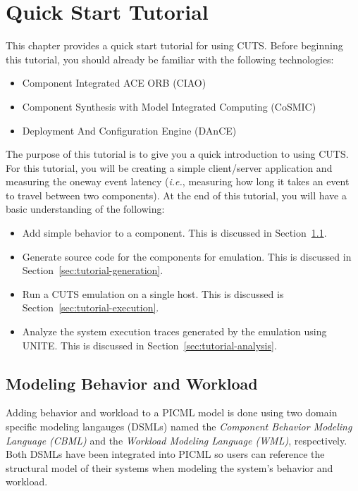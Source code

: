 
\chapter{Quick Start Tutorial}
\label{chap:tutorial}

This chapter provides a quick start tutorial for using CUTS. Before 
beginning this tutorial, you should already be familiar with the 
following technologies:
\begin{itemize}
 \item Component Integrated ACE ORB (CIAO)
 \item Component Synthesis with Model Integrated Computing (CoSMIC)
 \item Deployment And Configuration Engine (DAnCE)
\end{itemize}

The purpose of this tutorial is to give you a quick introduction 
to using CUTS. For this tutorial, you will be creating a simple 
client/server application and measuring the oneway event latency 
(\textit{i.e.}, measuring how long it takes an event to travel between 
two components). At the end of this tutorial, you will have a basic 
understanding of the following:
\begin{itemize}
 \item Add simple behavior to a component. This is discussed in
 Section~\ref{sec:tutorial-behavior}.
 
 \item Generate source code for the components for emulation. This 
 is discussed in Section~\ref{sec:tutorial-generation}.

 \item Run a CUTS emulation on a single host. This is discussed
 is Section~\ref{sec:tutorial-execution}.
 
 \item Analyze the system execution traces generated by the 
 emulation using UNITE. This is discussed in 
 Section~\ref{sec:tutorial-analysis}.
\end{itemize}

\section{Modeling Behavior and Workload}
\label{sec:tutorial-behavior}

Adding behavior and workload to a PICML model is done using two 
domain specific modeling langauges (DSMLs) named the 
\textit{Component Behavior Modeling Language (CBML)} and the 
\textit{Workload Modeling Language (WML)}, respectively. Both 
DSMLs have been integrated into PICML so users can reference 
the structural model of their systems when modeling the system's 
behavior and workload.


